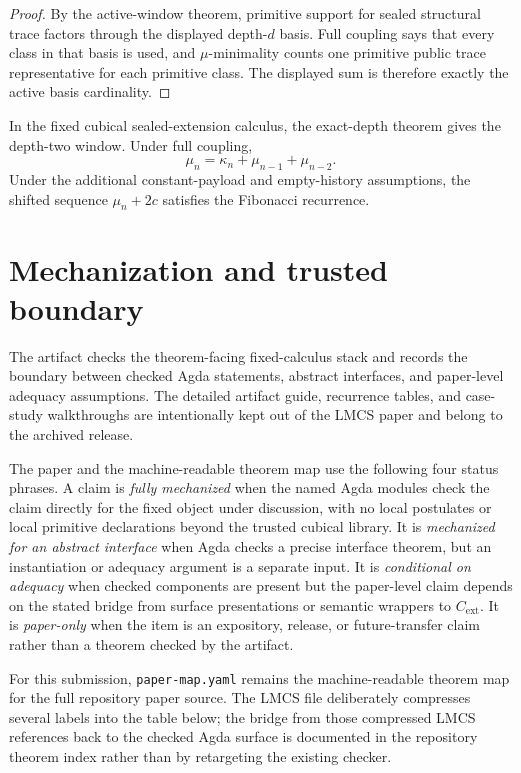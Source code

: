 \documentclass{lmcs}
\begin{document}
\begin{proof}
By the active-window theorem, primitive support for sealed structural trace
factors through the displayed depth-\(d\) basis.  Full coupling says that every
class in that basis is used, and \(\mu\)-minimality counts one primitive public
trace representative for each primitive class.  The displayed sum is therefore
exactly the active basis cardinality.
\end{proof}

\begin{cor}
In the fixed cubical sealed-extension calculus, the exact-depth theorem gives
the depth-two window.  Under full coupling,
\[
  \mu_n = \kappa_n + \mu_{n-1}+\mu_{n-2}.
\]
Under the additional constant-payload and empty-history assumptions, the shifted
sequence \(\mu_n+2c\) satisfies the Fibonacci recurrence.
\end{cor}


\section{Mechanization and trusted boundary}
\label{sec:mechanization}

The artifact checks the theorem-facing fixed-calculus stack and records the
boundary between checked Agda statements, abstract interfaces, and paper-level
adequacy assumptions.  The detailed artifact guide, recurrence tables, and
case-study walkthroughs are intentionally kept out of the LMCS paper and belong
to the archived release.

The paper and the machine-readable theorem map use the following four status
phrases.  A claim is \emph{fully mechanized} when the named Agda modules check
the claim directly for the fixed object under discussion, with no local
postulates or local primitive declarations beyond the trusted cubical library.
It is \emph{mechanized for an abstract interface} when Agda checks a precise
interface theorem, but an instantiation or adequacy argument is a separate
input.  It is \emph{conditional on adequacy} when checked components are present
but the paper-level claim depends on the stated bridge from surface
presentations or semantic wrappers to \(C_{\mathrm{ext}}\).  It is
\emph{paper-only} when the item is an expository, release, or future-transfer
claim rather than a theorem checked by the artifact.

For this submission, \texttt{paper-map.yaml} remains the machine-readable theorem map for the
full repository paper source.  The LMCS file deliberately compresses several labels into the
table below; the bridge from those compressed LMCS references back to the checked Agda surface
is documented in the repository theorem index rather than by retargeting the existing checker.
\end{document}
